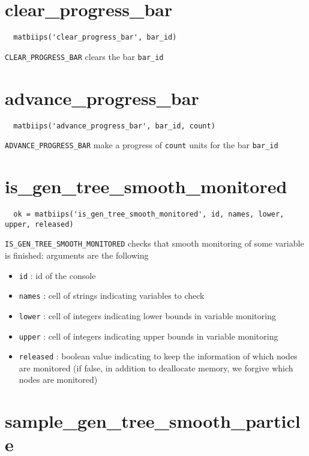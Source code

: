 \documentclass[11pt,twoside]{article}
\begin{document}
\section{clear\_progress\_bar}

 \begin{lstlisting}
  matbiips('clear_progress_bar', bar_id)
 \end{lstlisting}
  \texttt{CLEAR\_PROGRESS\_BAR} clears the bar \texttt{bar\_id}

\section{advance\_progress\_bar}

 \begin{lstlisting}
  matbiips('advance_progress_bar', bar_id, count)
 \end{lstlisting}

 \texttt{ADVANCE\_PROGRESS\_BAR} make a progress of \texttt{count} units for the bar \texttt{bar\_id}


\section{is\_gen\_tree\_smooth\_monitored}

 \begin{lstlisting}
  ok = matbiips('is_gen_tree_smooth_monitored', id, names, lower, upper, released)
 \end{lstlisting}

\texttt{IS\_GEN\_TREE\_SMOOTH\_MONITORED} checks that smooth monitoring of some variable is finished: arguments are the following

 \begin{itemize}
  \item \texttt{id} : id of the console
  \item \texttt{names} : cell of strings indicating variables to check
  \item \texttt{lower} : cell of integers indicating lower bounds in variable monitoring
  \item \texttt{upper} : cell of integers indicating upper bounds in variable monitoring
  \item \texttt{released} : boolean value indicating to keep the information of which nodes are monitored (if false, in addition to deallocate memory,
  we forgive which nodes are monitored)
 \end{itemize}


\section{sample\_gen\_tree\_smooth\_particle}
\end{document}
